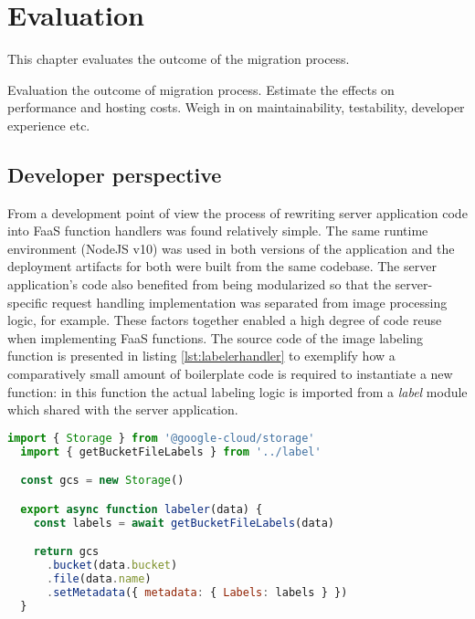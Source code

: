 \chapter{Evaluation} \label{cha:evaluation}

This chapter evaluates the outcome of the migration process.

Evaluation the outcome of migration process. Estimate the effects on performance and hosting costs. Weigh in on maintainability, testability, developer experience etc.

\section{Developer perspective}

From a development point of view the process of rewriting server application code into FaaS function handlers was found relatively simple. The same runtime environment (NodeJS v10) was used in both versions of the application and the deployment artifacts for both were built from the same codebase. The server application's code also benefited from being modularized so that the server-specific request handling implementation was separated from image processing logic, for example. These factors together enabled a high degree of code reuse when implementing FaaS functions. The source code of the image labeling function is presented in listing \ref{lst:labelerhandler} to exemplify how a comparatively small amount of boilerplate code is required to instantiate a new function: in this function the actual labeling logic is imported from a \textit{label} module which shared with the server application.

\begin{lstlisting}[language=JavaScript,caption=Image labeler function handler,captionpos=b,label=lst:labelerhandler,showstringspaces=false,belowskip=2em,frame=tb,aboveskip=2em]
  import { Storage } from '@google-cloud/storage'
  import { getBucketFileLabels } from '../label'

  const gcs = new Storage()

  export async function labeler(data) {
    const labels = await getBucketFileLabels(data)

    return gcs
      .bucket(data.bucket)
      .file(data.name)
      .setMetadata({ metadata: { Labels: labels } })
  }
\end{lstlisting}

